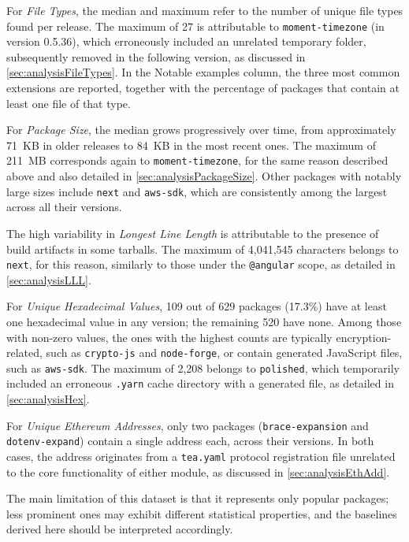 For \emph{File Types}, the median and maximum refer to the number of unique file types found per release.
The maximum of 27 is attributable to \texttt{moment-timezone} (in version 0.5.36),
which erroneously included an unrelated temporary folder, subsequently removed in the following version, as discussed in \cref{sec:analysisFileTypes}.
In the Notable examples column, the three most common extensions are reported,
together with the percentage of packages that contain at least one file of that type.

For \emph{Package Size}, the median grows progressively over time, 
from approximately 71~KB in older releases to 84~KB in the most recent ones.
The maximum of 211~MB corresponds again to \texttt{moment-timezone}, 
for the same reason described above and also detailed in \cref{sec:analysisPackageSize}.
Other packages with notably large sizes include \texttt{next} and \texttt{aws-sdk},
which are consistently among the largest across all their versions.

The high variability in \emph{Longest Line Length} is attributable to the presence of build artifacts in some tarballs.
The maximum of 4,041,545 characters belongs to \texttt{next},
for this reason, similarly to those under the \texttt{@angular} scope, as detailed in \cref{sec:analysisLLL}.

For \emph{Unique Hexadecimal Values}, 109 out of 629 packages (17.3\%) have at least one hexadecimal value in any version; 
the remaining 520 have none.
Among those with non-zero values, the ones with the highest counts are typically encryption-related,
such as \texttt{crypto-js} and \texttt{node-forge}, or contain generated JavaScript files, such as \texttt{aws-sdk}.
The maximum of 2,208 belongs to \texttt{polished}, 
which temporarily included an erroneous \texttt{.yarn} cache directory with a generated file, as detailed in \cref{sec:analysisHex}.

For \emph{Unique Ethereum Addresses}, only two packages (\texttt{brace-expansion} and \texttt{dotenv-expand})
contain a single address each, across their versions.
In both cases, the address originates from a \texttt{tea.yaml} protocol registration file unrelated to the core functionality of either module, 
as discussed in \cref{sec:analysisEthAdd}.

The main limitation of this dataset is that it represents only popular packages; 
less prominent ones may exhibit different statistical properties, and the baselines derived here should be interpreted accordingly.

